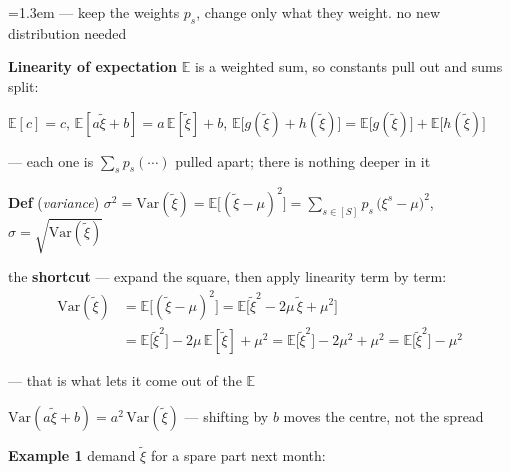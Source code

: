 \documentclass[10pt]{article}
\newenvironment{board}{%
  \par\vspace{4pt}
  \begingroup\leftskip=1.3em\relax\parskip=2pt\relax}{%
  \par\endgroup\vspace{4pt}}
\begin{document}
\begin{board}
\quad --- keep the weights $p_s$, change only what they weight. no new distribution needed
\vspace{12pt}

\textbf{Linearity of expectation} \quad $\mathbb{E}$ is a weighted sum, so constants pull out and sums split:
\vspace{4pt}

\quad $\mathbb{E}[c] = c$, \qquad
      $\mathbb{E}[a\tilde\xi + b] = a\,\mathbb{E}[\tilde\xi] + b$, \qquad
      $\mathbb{E}\big[g(\tilde\xi) + h(\tilde\xi)\big] = \mathbb{E}\big[g(\tilde\xi)\big] + \mathbb{E}\big[h(\tilde\xi)\big]$
\vspace{3pt}

\quad --- each one is $\sum_s p_s(\cdots)$ pulled apart; there is nothing deeper in it
\vspace{12pt}

\textbf{Def} (\emph{variance}) \quad
$\sigma^2 = \mathrm{Var}(\tilde\xi) = \mathbb{E}\big[(\tilde\xi - \mu)^2\big] = \sum_{s \in [S]} p_s\, \big(\xi^s - \mu\big)^2$,
\qquad $\sigma = \sqrt{\mathrm{Var}(\tilde\xi)}$
\vspace{4pt}

\quad the \textbf{shortcut} --- expand the square, then apply linearity term by term:
\[
\begin{aligned}
\mathrm{Var}(\tilde\xi)
  &= \mathbb{E}\big[(\tilde\xi - \mu)^2\big]
   = \mathbb{E}\big[\tilde\xi^2 - 2\mu\,\tilde\xi + \mu^2\big] \\[2pt]
  &= \mathbb{E}\big[\tilde\xi^2\big] - 2\mu\,\mathbb{E}[\tilde\xi] + \mu^2
   = \mathbb{E}\big[\tilde\xi^2\big] - 2\mu^2 + \mu^2
   = \mathbb{E}\big[\tilde\xi^2\big] - \mu^2
\end{aligned}
\]

 --- that is what lets it come out of the $\mathbb{E}$
\vspace{6pt}

\quad $\mathrm{Var}(a\tilde\xi + b) = a^2\,\mathrm{Var}(\tilde\xi)$
\qquad --- shifting by $b$ moves the centre, not the spread
\vspace{12pt}

\textbf{Example 1} \quad demand $\tilde\xi$ for a spare part next month:
\vspace{5pt}


\end{board}
\end{document}
